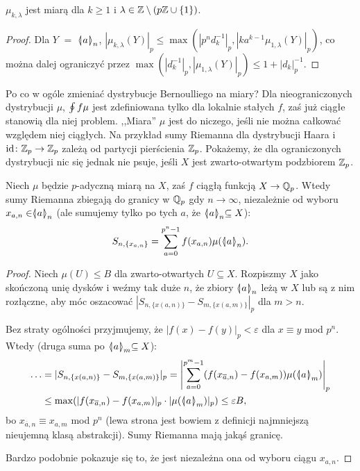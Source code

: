 \begin{wniosek}
	$\mu_{k, \lambda}$ jest miarą dla $k \ge 1$ i $\lambda \in \mathbb Z \setminus (p\mathbb Z \cup \{1\})$.
\end{wniosek}

\begin{proof}
	Dla $Y$ $=$ $\mathrel{\langle\mkern-3.85mu\mid\mkern-4mu} {a}\mathrel{\mkern-4mu\mid\mkern-3.85mu\rangle}_{n}$, $|\mu_{k, \lambda}(Y)|_p \le \max (|p^nd_k^{-1}|_p, |k a^{k-1} \mu_{1, \lambda}(Y)|_p )$, co można dalej ograniczyć przez $\max (|d_k^{-1}|_p, |\mu_{1, \lambda}(Y)|_p) \le 1 + |d_k|_p^{-1}$.
\end{proof}

Po co w ogóle zmieniać dystrybucje Bernoulliego na miary?
Dla nieograniczonych dystrybucji $\mu$, $\oint f\mu$ jest zdefiniowana tylko dla lokalnie stałych $f$, zaś już ciągłe stanowią dla niej problem.
,,Miara'' $\mu$ jest do niczego, jeśli nie można całkować względem niej ciągłych.
Na przykład sumy Riemanna dla dystrybucji Haara i $\textrm{id} \colon \mathbb Z_p \to \mathbb Z_p$ zależą od partycji pierścienia $\mathbb Z_p$.
Pokażemy, że dla ograniczonych dystrybucji nic się jednak nie psuje, jeśli $X$ jest zwarto-otwartym podzbiorem $\mathbb Z_p$.

\begin{fakt}
	Niech $\mu$ będzie $p$-adyczną miarą na $X$, zaś $f$ ciągłą funkcją $ X \to \mathbb Q_p$.
	Wtedy sumy Riemanna zbiegają do granicy w $\mathbb Q_p$ gdy $n \to \infty$, niezależnie od wyboru $x_{a,n} \in \mathrel{\langle\mkern-3.85mu\mid\mkern-4mu} {a}\mathrel{\mkern-4mu\mid\mkern-3.85mu\rangle}_{n}$ (ale sumujemy tylko po tych $a$, że $\mathrel{\langle\mkern-3.85mu\mid\mkern-4mu} {a}\mathrel{\mkern-4mu\mid\mkern-3.85mu\rangle}_{n} \subseteq X$):
	\[
		S_{n, \{x_{a, n}\}} = \sum_{a=0}^{p^n-1} f(x_{a, n}) \mu(\mathrel{\langle\mkern-3.85mu\mid\mkern-4mu} {a}\mathrel{\mkern-4mu\mid\mkern-3.85mu\rangle}_{n}).
	\]
\end{fakt}

\begin{proof}
	Niech $\mu(U) \le B$ dla zwarto-otwartych $U \subseteq X$.
	Rozpiszmy $X$ jako skończoną unię dysków i weźmy tak duże $n$, że zbiory $\mathrel{\langle\mkern-3.85mu\mid\mkern-4mu} {a}\mathrel{\mkern-4mu\mid\mkern-3.85mu\rangle}_{n}$ leżą w $X$ lub są z nim rozłączne, aby móc oszacować $|S_{n, \{x(a, n)\}} - S_{m, \{x(a, m)\}}|_p$ dla $m > n$.

	Bez straty ogólności przyjmujemy, że $|f(x) - f(y)|_p < \varepsilon$ dla $x \equiv y$ mod $p^n$.
	Wtedy (druga suma po $\mathrel{\langle\mkern-3.85mu\mid\mkern-4mu} {a}\mathrel{\mkern-4mu\mid\mkern-3.85mu\rangle}_{m} \subseteq X$):
	\begin{align*}
		\ldots & = |S_{n, \{x(a, n)\}} - S_{m, \{x(a, m)\}}|_p  = \left|\sum_{a = 0}^{p^m-1} (f(x_{\overline a, n}) - f(x_{a, m})) \mu(\mathrel{\langle\mkern-3.85mu\mid\mkern-4mu} {a}\mathrel{\mkern-4mu\mid\mkern-3.85mu\rangle}_{m})\right|_p \\
		& \le \max (|f(x_{\overline a, n}) - f(x_{a, m})|_p \cdot |\mu(\mathrel{\langle\mkern-3.85mu\mid\mkern-4mu} {a}\mathrel{\mkern-4mu\mid\mkern-3.85mu\rangle}_{m})|_p) \le \varepsilon B,
	\end{align*}
	bo $x_{\overline a, n} \equiv x_{a, m}$ mod $p^n$ (lewa strona jest bowiem z definicji najmniejszą nieujemną klasą abstrakcji).
	Sumy Riemanna mają jakąś granicę.

	Bardzo podobnie pokazuje się to, że jest niezależna ona od wyboru ciągu $x_{a,n}$.
\end{proof}

